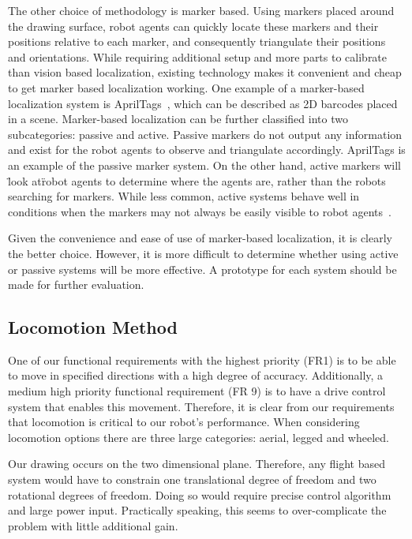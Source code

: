 The other choice of methodology is marker based. Using markers placed around the drawing surface, robot agents can quickly locate these markers and their positions relative to each marker, and consequently triangulate their positions and orientations. While requiring additional setup and more parts to calibrate than vision based localization, existing technology makes it convenient and cheap to get marker based localization working. One example of a marker-based localization system is AprilTags~\cite{olson2011apriltag}, which can be described as 2D barcodes placed in a scene. Marker-based localization can be further classified into two subcategories: passive and active. Passive markers do not output any information and exist for the robot agents to observe and triangulate accordingly. AprilTags is an example of the passive marker system. On the other hand, active markers will \"look at\" robot agents to determine where the agents are, rather than the robots searching for markers. While less common, active systems behave well in conditions when the markers may not always be easily visible to robot agents~\cite{cassinis2005active}.

Given the convenience and ease of use of marker-based localization, it is clearly the better choice. However, it is more difficult to determine whether using active or passive systems will be more effective. A prototype for each system should be made for further evaluation.

\subsection{Locomotion Method}
\label{sec:trade_locomotion}
One of our functional requirements with the highest priority (FR1) is to be able to move in specified directions with a high degree of accuracy. Additionally, a medium high priority functional requirement (FR 9) is to have a drive control system that enables this movement. Therefore, it is clear from our requirements that locomotion is critical to our robot's performance. When considering locomotion options there are three large categories: aerial, legged and wheeled. 

Our drawing occurs on the two dimensional plane. Therefore, any flight based system would have to constrain one translational degree of freedom and two rotational degrees of freedom. Doing so would require precise control algorithm and large power input. Practically speaking, this seems to over-complicate the problem with little additional gain. 

